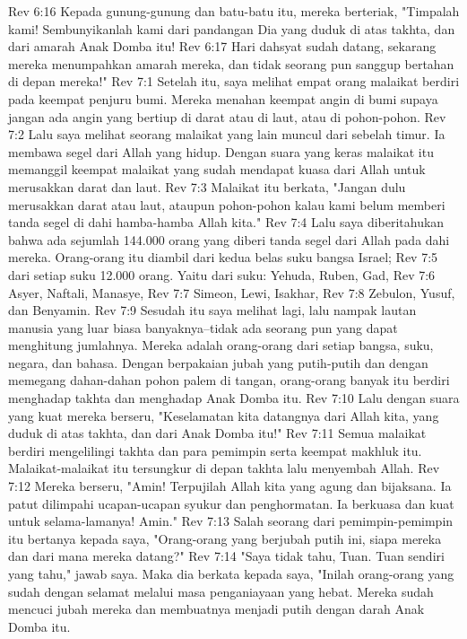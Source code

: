 Rev 6:16  Kepada gunung-gunung dan batu-batu itu, mereka berteriak, "Timpalah kami! Sembunyikanlah kami dari pandangan Dia yang duduk di atas takhta, dan dari amarah Anak Domba itu!
Rev 6:17  Hari dahsyat sudah datang, sekarang mereka menumpahkan amarah mereka, dan tidak seorang pun sanggup bertahan di depan mereka!"
Rev 7:1  Setelah itu, saya melihat empat orang malaikat berdiri pada keempat penjuru bumi. Mereka menahan keempat angin di bumi supaya jangan ada angin yang bertiup di darat atau di laut, atau di pohon-pohon.
Rev 7:2  Lalu saya melihat seorang malaikat yang lain muncul dari sebelah timur. Ia membawa segel dari Allah yang hidup. Dengan suara yang keras malaikat itu memanggil keempat malaikat yang sudah mendapat kuasa dari Allah untuk merusakkan darat dan laut.
Rev 7:3  Malaikat itu berkata, "Jangan dulu merusakkan darat atau laut, ataupun pohon-pohon kalau kami belum memberi tanda segel di dahi hamba-hamba Allah kita."
Rev 7:4  Lalu saya diberitahukan bahwa ada sejumlah 144.000 orang yang diberi tanda segel dari Allah pada dahi mereka. Orang-orang itu diambil dari kedua belas suku bangsa Israel;
Rev 7:5  dari setiap suku 12.000 orang. Yaitu dari suku: Yehuda, Ruben, Gad,
Rev 7:6  Asyer, Naftali, Manasye,
Rev 7:7  Simeon, Lewi, Isakhar,
Rev 7:8  Zebulon, Yusuf, dan Benyamin.
Rev 7:9  Sesudah itu saya melihat lagi, lalu nampak lautan manusia yang luar biasa banyaknya--tidak ada seorang pun yang dapat menghitung jumlahnya. Mereka adalah orang-orang dari setiap bangsa, suku, negara, dan bahasa. Dengan berpakaian jubah yang putih-putih dan dengan memegang dahan-dahan pohon palem di tangan, orang-orang banyak itu berdiri menghadap takhta dan menghadap Anak Domba itu.
Rev 7:10  Lalu dengan suara yang kuat mereka berseru, "Keselamatan kita datangnya dari Allah kita, yang duduk di atas takhta, dan dari Anak Domba itu!"
Rev 7:11  Semua malaikat berdiri mengelilingi takhta dan para pemimpin serta keempat makhluk itu. Malaikat-malaikat itu tersungkur di depan takhta lalu menyembah Allah.
Rev 7:12  Mereka berseru, "Amin! Terpujilah Allah kita yang agung dan bijaksana. Ia patut dilimpahi ucapan-ucapan syukur dan penghormatan. Ia berkuasa dan kuat untuk selama-lamanya! Amin."
Rev 7:13  Salah seorang dari pemimpin-pemimpin itu bertanya kepada saya, "Orang-orang yang berjubah putih ini, siapa mereka dan dari mana mereka datang?"
Rev 7:14  "Saya tidak tahu, Tuan. Tuan sendiri yang tahu," jawab saya. Maka dia berkata kepada saya, "Inilah orang-orang yang sudah dengan selamat melalui masa penganiayaan yang hebat. Mereka sudah mencuci jubah mereka dan membuatnya menjadi putih dengan darah Anak Domba itu.
